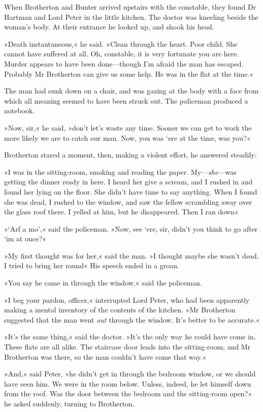 When Brotherton and Bunter arrived upstairs with the constable, they found Dr Hartman and Lord Peter in the little kitchen. The doctor was kneeling beside the woman's body. At their entrance he looked up, and shook his head.

»Death instantaneous,« he said. »Clean through the heart. Poor child. She cannot have suffered at all. Oh, constable, it is very fortunate you are here. Murder appears to have been done—though I'm afraid the man has escaped. Probably Mr Brotherton can give us some help. He was in the flat at the time.«

The man had sunk down on a chair, and was gazing at the body with a face from which all meaning seemed to have been struck out. The policeman produced a notebook.

»Now, sir,« he said, »don't let's waste any time. Sooner we can get to work the more likely we are to catch our man. Now, you was `ere at the time, was you?«

Brotherton stared a moment, then, making a violent effort, he answered steadily:

»I was in the sitting-room, smoking and reading the paper. My—\textit{she}—was getting the dinner ready in here. I heard her give a scream, and I rushed in and found her lying on the floor. She didn't have time to say anything. When I found she was dead, I rushed to the window, and saw the fellow scrambling away over the glass roof there. I yelled at him, but he disappeared. Then I ran down\longdash«

»`Arf a mo',« said the policeman. »Now, see `ere, sir, didn't you think to go after `im at once?«

»My first thought was for her,« said the man. »I thought maybe she wasn't dead. I tried to bring her round\longdash« His speech ended in a groan.

»You say he came in through the window,« said the policeman.

»I beg your pardon, officer,« interrupted Lord Peter, who had been apparently making a mental inventory of the contents of the kitchen. »Mr Brotherton suggested that the man went \textit{out} through the window. It's better to be accurate.«

»It's the same thing,« said the doctor. »It's the only way he could have come in. These flats are all alike. The staircase door leads into the sitting-room, and Mr Brotherton was there, so the man couldn't have come that way.«

»And,« said Peter, »he didn't get in through the bedroom window, or we should have seen him. We were in the room below. Unless, indeed, he let himself down from the roof. Was the door between the bedroom and the sitting-room open?« he asked suddenly, turning to Brotherton.

